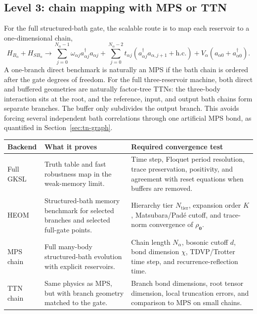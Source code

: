 \documentclass[11pt,a4paper]{article}
\theoremstyle{plain}
\theoremstyle{definition}
\theoremstyle{remark}
\begin{document}
\subsection{Level 3: chain mapping with MPS or TTN}
For the full structured-bath gate, the scalable route is to map each
reservoir to a one-dimensional chain,
\begin{equation}
H_{B_\alpha}+H_{SB_\alpha}
\longrightarrow
\sum_{j=0}^{N_\alpha-1}\omega_{\alpha j}a_{\alpha j}^{\dagger}a_{\alpha j}
 +
\sum_{j=0}^{N_\alpha-2}t_{\alpha j}
(a_{\alpha j}^{\dagger}a_{\alpha,j+1}+\mathrm{h.c.})
 + V_{\alpha}(a_{\alpha0}+a_{\alpha0}^{\dagger}).
\label{eq:mps-chain-map}
\end{equation}
A one-branch direct benchmark is naturally an MPS if the bath chain is
ordered after the gate degrees of freedom.  For the full three-reservoir
machine, both direct and buffered geometries are naturally factor-tree
TTNs: the three-body interaction sits at the root, and the reference,
input, and output bath chains form separate branches.  The buffer only
subdivides the output branch.  This avoids forcing several independent
bath correlations through one artificial MPS bond, as quantified in
Section~\ref{sec:tn-graph}.

\begin{center}
\small
\begin{tabularx}{\textwidth}{@{}l X X@{}}
\toprule
Backend & What it proves & Required convergence test \\
\midrule
Full GKSL &
Truth table and fast robustness map in the weak-memory limit. &
Time step, Floquet period resolution, trace preservation, positivity,
and agreement with reset equations when buffers are removed. \\
HEOM &
Structured-bath memory benchmark for selected branches and selected
full-gate points. &
Hierarchy tier $N_{\mathrm{tier}}$, expansion order $K$,
Matsubara/Padé cutoff, and trace-norm convergence of $\rho_{\mathbf0}$. \\
MPS chain &
Full many-body structured-bath evolution with explicit reservoirs. &
Chain length $N_\alpha$, bosonic cutoff $d$, bond dimension $\chi$,
TDVP/Trotter time step, and recurrence-reflection time. \\
TTN chain &
Same physics as MPS, but with branch geometry matched to the gate. &
Branch bond dimensions, root tensor dimension, local truncation errors,
and comparison to MPS on small chains. \\
\bottomrule
\end{tabularx}
\end{center}
\end{document}
